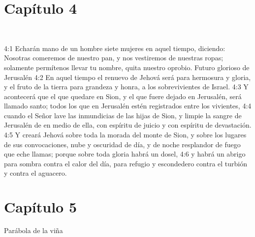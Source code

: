 \section*{Capítulo 4} 
 
4:1 Echarán mano de un hombre siete mujeres en aquel tiempo, diciendo: Nosotras comeremos de nuestro pan, y nos vestiremos de nuestras ropas; solamente permítenos llevar tu nombre, quita nuestro oprobio. 
Futuro glorioso de Jerusalén 
4:2 En aquel tiempo el renuevo de Jehová será para hermosura y gloria, y el fruto de la tierra para grandeza y honra, a los sobrevivientes de Israel. 
4:3 Y acontecerá que el que quedare en Sion, y el que fuere dejado en Jerusalén, será llamado santo; todos los que en Jerusalén estén registrados entre los vivientes, 
4:4 cuando el Señor lave las inmundicias de las hijas de Sion, y limpie la sangre de Jerusalén de en medio de ella, con espíritu de juicio y con espíritu de devastación. 
4:5 Y creará Jehová sobre toda la morada del monte de Sion, y sobre los lugares de sus convocaciones, nube y oscuridad de día, y de noche resplandor de fuego que eche llamas; porque sobre toda gloria habrá un dosel, 
4:6 y habrá un abrigo para sombra contra el calor del día, para refugio y escondedero contra el turbión y contra el aguacero. 
\section*{Capítulo 5}
Parábola de la viña 
 
